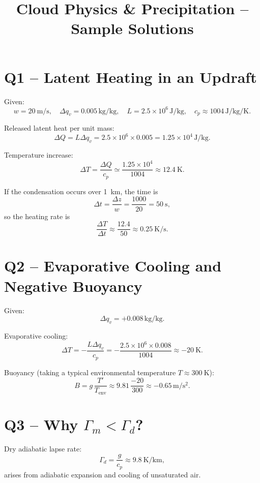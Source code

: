 \documentclass[12pt,a4paper]{article}
\title{Cloud Physics \& Precipitation -- Sample Solutions}
\author{}
\date{}
\begin{document}
\maketitle

\section*{Q1 -- Latent Heating in an Updraft}

Given:
\[
w = \SI{20}{\meter\per\second}, \quad
\Delta q_v = 0.005 \,\si{\kilo\gram\per\kilo\gram}, \quad
L = 2.5\times 10^6 \,\si{\joule\per\kilo\gram}, \quad
c_p \approx 1004 \,\si{\joule\per\kilo\gram\per\kelvin}.
\]

Released latent heat per unit mass:
\[
\Delta Q = L \Delta q_v
= 2.5\times 10^6 \times 0.005
= 1.25\times 10^4 \,\si{\joule\per\kilo\gram}.
\]

Temperature increase:
\[
\Delta T = \frac{\Delta Q}{c_p}
\simeq \frac{1.25\times 10^4}{1004}
\approx \SI{12.4}{\kelvin}.
\]

If the condensation occurs over \SI{1}{\kilo\meter}, the time is
\[
\Delta t = \frac{\Delta z}{w}
= \frac{1000}{20}
= \SI{50}{\second},
\]
so the heating rate is
\[
\frac{\Delta T}{\Delta t} \approx
\frac{12.4}{50} \approx \SI{0.25}{\kelvin\per\second}.
\]

\section*{Q2 -- Evaporative Cooling and Negative Buoyancy}

Given:
\[
\Delta q_v = +0.008 \,\si{\kilo\gram\per\kilo\gram}.
\]

Evaporative cooling:
\[
\Delta T = -\frac{L \Delta q_v}{c_p}
= -\frac{2.5\times 10^6 \times 0.008}{1004}
\approx -\SI{20}{\kelvin}.
\]

Buoyancy (taking a typical environmental temperature
\(T \approx \SI{300}{\kelvin}\)):
\[
B = g\,\frac{T' }{T_{\text{env}}}
\approx 9.81 \,\frac{-20}{300}
\approx -0.65 \,\si{\meter\per\second\squared}.
\]

\section*{Q3 -- Why \texorpdfstring{$\Gamma_m < \Gamma_d$}{Γm < Γd}?}

Dry adiabatic lapse rate:
\[
\Gamma_d = \frac{g}{c_p} \approx
\SI{9.8}{\kelvin\per\kilo\meter},
\]
arises from adiabatic expansion and cooling of unsaturated air.
\end{document}
